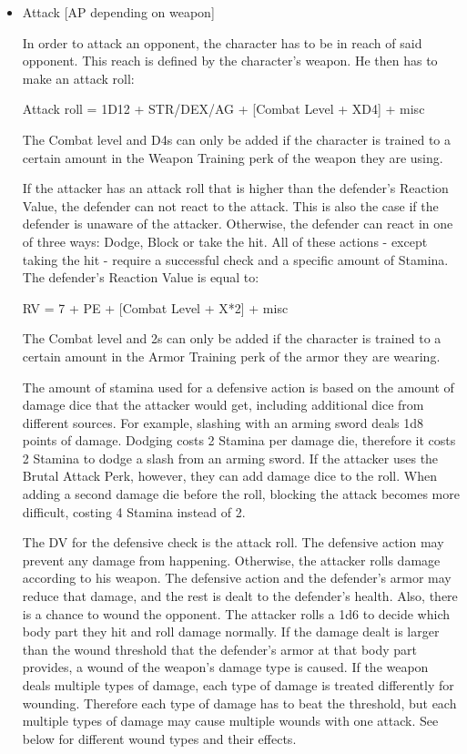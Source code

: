 \begin{itemize}

\item Attack [AP depending on weapon]

In order to attack an opponent, the character has to be in reach of said opponent. This reach is defined by the character’s weapon. He then has to make an attack roll:

Attack roll = 1D12 + STR/DEX/AG + [Combat Level + XD4] + misc

The Combat level and D4s can only be added if the character is trained to a certain amount in the Weapon Training perk of the weapon they are using.

If the attacker has an attack roll that is higher than the defender's Reaction Value, the defender can not react to the attack. This is also the case if the defender is unaware of the attacker. Otherwise, the defender can react in one of three ways: Dodge, Block or take the hit. All of these actions - except taking the hit - require a successful check and a specific amount of Stamina.
The defender's Reaction Value is equal to:

RV = 7 + PE + [Combat Level + X*2] + misc

The Combat level and 2s can only be added if the character is trained to a certain amount in the Armor Training perk of the armor they are wearing.

The amount of stamina used for a defensive action is based on the amount of damage dice that the attacker would get, including additional dice from different sources. For example, slashing with an arming sword deals 1d8 points of damage. Dodging costs 2 Stamina per damage die, therefore it costs 2 Stamina to dodge a slash from an arming sword. If the attacker uses the Brutal Attack Perk, however, they can add damage dice to the roll. When adding a second damage die before the roll, blocking the attack becomes more difficult, costing 4 Stamina instead of 2.

The DV for the defensive check is the attack roll. The defensive action may prevent any damage from happening. Otherwise, the attacker rolls damage according to his weapon. The defensive action and the defender's armor may reduce that damage, and the rest is dealt to the defender’s health. Also, there is a chance to wound the opponent. The attacker rolls a 1d6 to decide which body part they hit and roll damage normally. If the damage dealt is larger than the wound threshold that the defender's armor at that body part provides, a wound of the weapon's damage type is caused. If the weapon deals multiple types of damage, each type of damage is treated differently for wounding. Therefore each type of damage has to beat the threshold, but each multiple types of damage may cause multiple wounds with one attack. See below for different wound types and their effects. 


\end{itemize}
